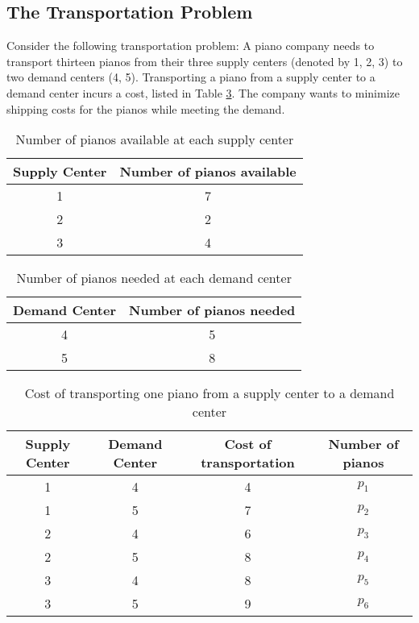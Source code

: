 \subsection*{The Transportation Problem}

Consider the following transportation problem:
A piano company needs to transport thirteen pianos from their three  supply centers (denoted by 1, 2, 3) to two demand centers (4, 5).
Transporting a piano from a supply center to a demand center incurs a cost, listed in Table \ref{tab:cost}.
The company wants to minimize shipping costs for the pianos while meeting the demand.

\begin{table}[H]
\centering
\begin{tabular}{|c|c|}
Supply Center & Number of pianos available\\
\hline
1 & 7\\
2 & 2\\
3 & 4\\
\end{tabular}

\caption{Number of pianos available at each supply center}
\label{tab:supply}
\end{table}

\begin{table}[H]
\centering
\begin{tabular}{|c|c|}
Demand Center & Number of pianos needed\\
\hline
4 & 5\\
5 & 8\\
\end{tabular}

\caption{Number of pianos needed at each demand center}
\label{tab:demand}
\end{table}

\begin{table}[H]
\centering
\begin{tabular}{|c|c|c|c|}
Supply Center & Demand Center & Cost of transportation & Number of pianos\\
\hline
1 & 4 & 4 & $p_1$\\
1 & 5 & 7 & $p_2$\\
2 & 4 & 6 & $p_3$\\
2 & 5 & 8 & $p_4$\\
3 & 4 & 8 & $p_5$\\
3 & 5 & 9 & $p_6$\\
\end{tabular}
\caption{Cost of transporting one piano from a supply center to a demand center}
\label{tab:cost}
\end{table}

